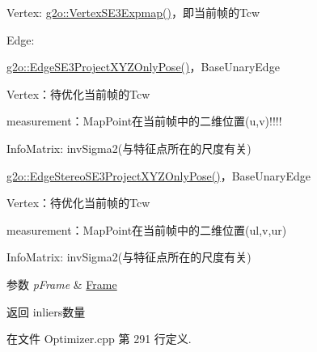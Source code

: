 \begin{DoxyEnumerate}
\item Vertex\-: \hyperlink{classg2o_1_1VertexSE3Expmap}{g2o\-::\-Vertex\-S\-E3\-Expmap()}，即当前帧的\-Tcw
\item Edge\-:
\begin{DoxyItemize}
\item \hyperlink{classg2o_1_1EdgeSE3ProjectXYZOnlyPose}{g2o\-::\-Edge\-S\-E3\-Project\-X\-Y\-Z\-Only\-Pose()}，\-Base\-Unary\-Edge
\begin{DoxyItemize}
\item Vertex：待优化当前帧的\-Tcw
\item measurement：\-Map\-Point在当前帧中的二维位置(u,v)!!!!
\item Info\-Matrix\-: inv\-Sigma2(与特征点所在的尺度有关)
\end{DoxyItemize}
\item \hyperlink{classg2o_1_1EdgeStereoSE3ProjectXYZOnlyPose}{g2o\-::\-Edge\-Stereo\-S\-E3\-Project\-X\-Y\-Z\-Only\-Pose()}，\-Base\-Unary\-Edge
\begin{DoxyItemize}
\item Vertex：待优化当前帧的\-Tcw
\item measurement：\-Map\-Point在当前帧中的二维位置(ul,v,ur)
\item Info\-Matrix\-: inv\-Sigma2(与特征点所在的尺度有关)
\end{DoxyItemize}
\end{DoxyItemize}
\end{DoxyEnumerate}


\begin{DoxyParams}{参数}
{\em p\-Frame} & \hyperlink{classORB__SLAM2_1_1Frame}{Frame} \\
\hline
\end{DoxyParams}
\begin{DoxyReturn}{返回}
inliers数量 
\end{DoxyReturn}


在文件 Optimizer.\-cpp 第 291 行定义.



